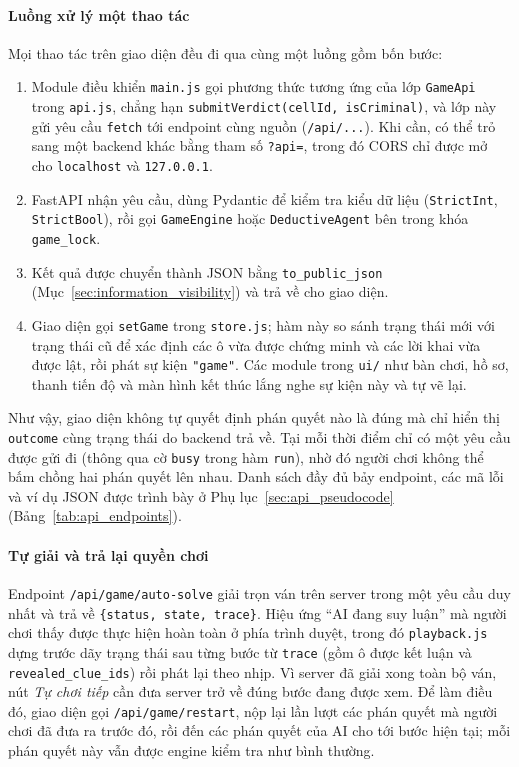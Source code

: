 \begin{sloppypar}

\paragraph{Luồng xử lý một thao tác}
Mọi thao tác trên giao diện đều đi qua cùng một luồng gồm bốn bước:
\begin{enumerate}
  \item Module điều khiển \texttt{main.js} gọi phương thức tương ứng của lớp
    \texttt{GameApi} trong \texttt{api.js}, chẳng hạn
    \texttt{submitVerdict(cellId, isCriminal)}, và lớp này gửi yêu cầu
    \texttt{fetch} tới endpoint cùng nguồn (\nolinkurl{/api/...}). Khi cần, có
    thể trỏ sang một backend khác bằng tham số \texttt{?api=}, trong đó CORS
    chỉ được mở cho \texttt{localhost} và \texttt{127.0.0.1}.
  \item FastAPI nhận yêu cầu, dùng Pydantic để kiểm tra kiểu dữ liệu
    (\texttt{StrictInt}, \texttt{StrictBool}), rồi gọi \texttt{GameEngine} hoặc
    \texttt{DeductiveAgent} bên trong khóa \texttt{game\_lock}.
  \item Kết quả được chuyển thành JSON bằng \texttt{to\_public\_json}
    (Mục~\ref{sec:information_visibility}) và trả về cho giao diện.
  \item Giao diện gọi \texttt{setGame} trong \texttt{store.js}; hàm này so sánh
    trạng thái mới với trạng thái cũ để xác định các ô vừa được chứng minh và
    các lời khai vừa được lật, rồi phát sự kiện \texttt{"game"}. Các module
    trong \texttt{ui/} như bàn chơi, hồ sơ, thanh tiến độ và màn hình kết thúc
    lắng nghe sự kiện này và tự vẽ lại.
\end{enumerate}
Như vậy, giao diện không tự quyết định phán quyết nào là đúng mà chỉ hiển thị
\texttt{outcome} cùng trạng thái do backend trả về. Tại mỗi thời điểm chỉ có một
yêu cầu được gửi đi (thông qua cờ \texttt{busy} trong hàm \texttt{run}), nhờ đó
người chơi không thể bấm chồng hai phán quyết lên nhau. Danh sách đầy đủ bảy
endpoint, các mã lỗi và ví dụ JSON được trình bày ở
Phụ lục~\ref{sec:api_pseudocode} (Bảng~\ref{tab:api_endpoints}).

\paragraph{Tự giải và trả lại quyền chơi}
Endpoint \nolinkurl{/api/game/auto-solve} giải trọn ván trên server trong một
yêu cầu duy nhất và trả về \texttt{\{status, state, trace\}}. Hiệu ứng ``AI đang
suy luận'' mà người chơi thấy được thực hiện hoàn toàn ở phía trình duyệt, trong
đó \texttt{playback.js} dựng trước dãy trạng thái sau từng bước từ
\texttt{trace} (gồm ô được kết luận và \texttt{revealed\_clue\_ids}) rồi phát lại
theo nhịp. Vì server đã giải xong toàn bộ ván, nút \emph{Tự chơi tiếp} cần đưa
server trở về đúng bước đang được xem. Để làm điều đó, giao diện gọi
\nolinkurl{/api/game/restart}, nộp lại lần lượt các phán quyết mà người chơi đã
đưa ra trước đó, rồi đến các phán quyết của AI cho tới bước hiện tại; mỗi phán
quyết này vẫn được engine kiểm tra như bình thường.


\end{sloppypar}
